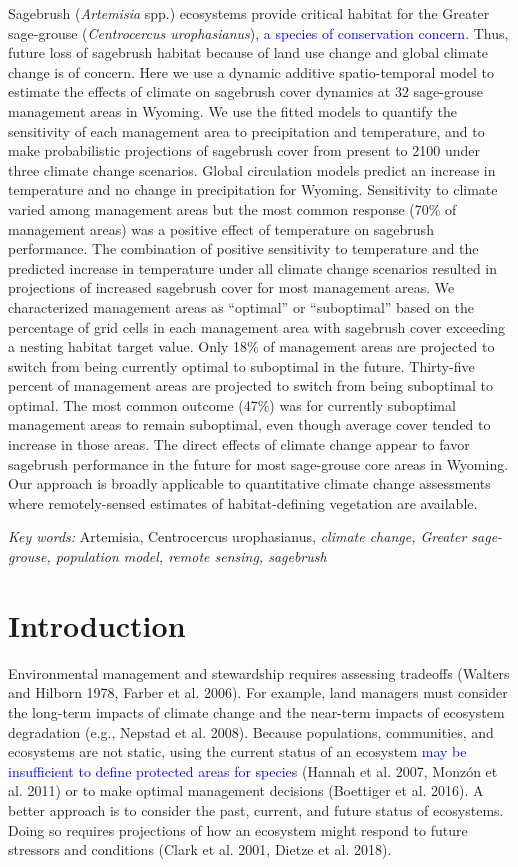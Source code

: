 \documentclass[
  12pt,
]{article}
\begin{document}
Sagebrush (\emph{Artemisia} spp.) ecosystems provide critical habitat for the Greater sage-grouse (\emph{Centrocercus urophasianus}), \textcolor{blue}{a species of conservation concern}.
Thus, future loss of sagebrush habitat because of land use change and global climate change is of concern.
Here we use a dynamic additive spatio-temporal model to estimate the effects of climate on sagebrush cover dynamics at 32 sage-grouse management areas in Wyoming.
We use the fitted models to quantify the sensitivity of each management area to precipitation and temperature, and to make probabilistic projections of sagebrush cover from present to 2100 under three climate change scenarios.
Global circulation models predict an increase in temperature and no change in precipitation for Wyoming.
Sensitivity to climate varied among management areas but the most common response (70\% of management areas) was a positive effect of temperature on sagebrush performance.
The combination of positive sensitivity to temperature and the predicted increase in temperature under all climate change scenarios resulted in projections of increased sagebrush cover for most management areas.
We characterized management areas as ``optimal'' or ``suboptimal'' based on the percentage of grid cells in each management area with sagebrush cover exceeding a nesting habitat target value.
Only 18\% of management areas are projected to switch from being currently optimal to suboptimal in the future.
Thirty-five percent of management areas are projected to switch from being suboptimal to optimal.
The most common outcome (47\%) was for currently suboptimal management areas to remain suboptimal, even though average cover tended to increase in those areas.
The direct effects of climate change appear to favor sagebrush performance in the future for most sage-grouse core areas in Wyoming.
Our approach is broadly applicable to quantitative climate change assessments where remotely-sensed estimates of habitat-defining vegetation are available.

\emph{Key words:} Artemisia, Centrocercus urophasianus, \emph{climate change, Greater sage-grouse, population model, remote sensing, sagebrush}

\hypertarget{introduction}{%
\section{Introduction}\label{introduction}}

Environmental management and stewardship requires assessing tradeoffs (Walters and Hilborn 1978, Farber et al. 2006).
For example, land managers must consider the long-term impacts of climate change and the near-term impacts of ecosystem degradation (e.g., Nepstad et al. 2008).
Because populations, communities, and ecosystems are not static, using the current status of an ecosystem \textcolor{blue}{may be insufficient to define protected areas for species} (Hannah et al. 2007, Monzón et al. 2011) or to make optimal management decisions (Boettiger et al. 2016).
A better approach is to consider the past, current, and future status of ecosystems.
Doing so requires projections of how an ecosystem might respond to future stressors and conditions (Clark et al. 2001, Dietze et al. 2018).
\end{document}
